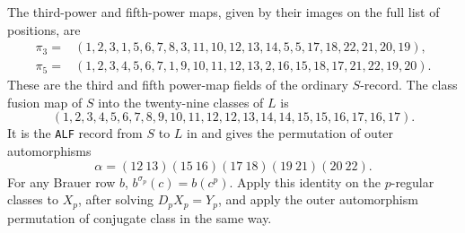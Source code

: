 \documentclass[11pt,a4paper]{article}
\numberwithin{equation}{section}
\theoremstyle{definition}
\theoremstyle{remark}
\begin{document}
The third-power and fifth-power maps, given by their images on the full list of positions, are
\begin{align*}
 \pi_3={}&(1,2,3,1,5,6,7,8,3,11,10,12,13,14,5,5,17,18,22,21,20,19),\\
 \pi_5={}&(1,2,3,4,5,6,7,1,9,10,11,12,13,2,16,15,18,17,21,22,19,20).
\end{align*}
These are the third and fifth power-map fields of the ordinary \(S\)-record. The class fusion map of $S$ into the twenty-nine classes of $L$ is
\[
(1,2,3,4,5,6,7,8,9,10,11,12,12,13,14,14,15,15,16,17,16,17).
\]
It is the \texttt{ALF} record from \(S\) to \(L\) in \cite{OrdData} and gives the permutation of outer automorphisms
\[
\alpha=(12\ 13)(15\ 16)(17\ 18)(19\ 21)(20\ 22).
\]
For any Brauer row \(b\), \(b^{\sigma_p}(c)=b(c^p)\). Apply this identity on the $p$-regular classes to \(X_p\), after solving \(D_pX_p=Y_p\), and apply the  outer automorphism permutation of conjugate class in the same way. 
\end{document}
